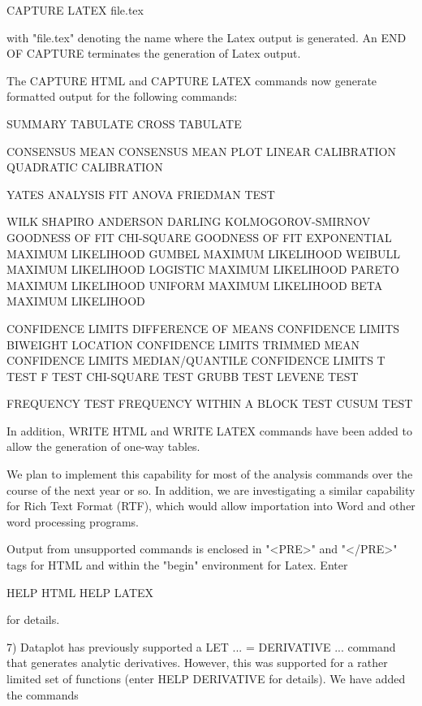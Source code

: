 {        CAPTURE LATEX  file.tex

    with "file.tex" denoting the name where the Latex output is
    generated.  An END OF CAPTURE terminates the generation of
    Latex output.

    The CAPTURE HTML and CAPTURE LATEX commands now generate formatted
    output for the following commands:

        SUMMARY
        TABULATE
        CROSS TABULATE

        CONSENSUS MEAN
        CONSENSUS MEAN PLOT
        LINEAR CALIBRATION
        QUADRATIC CALIBRATION

        YATES ANALYSIS
        FIT
        ANOVA
        FRIEDMAN TEST

        WILK SHAPIRO
        ANDERSON DARLING
        KOLMOGOROV-SMIRNOV GOODNESS OF FIT
        CHI-SQUARE GOODNESS OF FIT
        EXPONENTIAL MAXIMUM LIKELIHOOD
        GUMBEL MAXIMUM LIKELIHOOD
        WEIBULL MAXIMUM LIKELIHOOD
        LOGISTIC MAXIMUM LIKELIHOOD
        PARETO MAXIMUM LIKELIHOOD
        UNIFORM MAXIMUM LIKELIHOOD
        BETA MAXIMUM LIKELIHOOD

        CONFIDENCE LIMITS
        DIFFERENCE OF MEANS CONFIDENCE LIMITS
        BIWEIGHT LOCATION CONFIDENCE LIMITS
        TRIMMED MEAN CONFIDENCE LIMITS
        MEDIAN/QUANTILE CONFIDENCE LIMITS
        T TEST
        F TEST
        CHI-SQUARE TEST
        GRUBB TEST
        LEVENE TEST

        FREQUENCY TEST
        FREQUENCY WITHIN A BLOCK TEST
        CUSUM TEST

    In addition, WRITE HTML and WRITE LATEX commands have been added
    to allow the generation of one-way tables.

    We plan to implement this capability for most of the analysis
    commands over the course of the next year or so.  In addition,
    we are investigating a similar capability for Rich Text
    Format (RTF), which would allow importation into Word and
    other word processing programs.

    Output from unsupported commands is enclosed in "<PRE>" and
    "</PRE>" tags for HTML and within the "begin{\verbatin}"
    environment for Latex.  Enter 

        HELP HTML
        HELP LATEX

    for details.

 7) Dataplot has previously supported a LET ... = DERIVATIVE ...
    command that generates analytic derivatives.  However, this was
    supported for a rather limited set of functions (enter
    HELP DERIVATIVE for details).  We have added the commands

}
